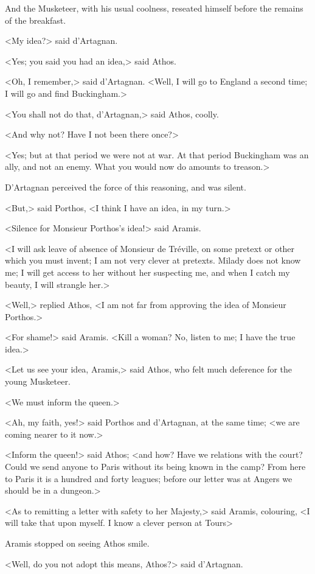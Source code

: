 And the Musketeer, with his usual coolness, reseated himself before the remains of the breakfast. 

<My idea?> said d'Artagnan. 

<Yes; you said you had an idea,> said Athos. 

<Oh, I remember,> said d'Artagnan. <Well, I will go to England a second time; I will go and find Buckingham.> 

<You shall not do that, d'Artagnan,> said Athos, coolly. 

<And why not? Have I not been there once?> 

<Yes; but at that period we were not at war. At that period Buckingham was an ally, and not an enemy. What you would now do amounts to treason.> 

D'Artagnan perceived the force of this reasoning, and was silent. 

<But,> said Porthos, <I think I have an idea, in my turn.> 

<Silence for Monsieur Porthos's idea!> said Aramis. 

<I will ask leave of absence of Monsieur de Tréville, on some pretext or other which you must invent; I am not very clever at pretexts. Milady does not know me; I will get access to her without her suspecting me, and when I catch my beauty, I will strangle her.> 

<Well,> replied Athos, <I am not far from approving the idea of Monsieur Porthos.> 

<For shame!> said Aramis. <Kill a woman? No, listen to me; I have the true idea.> 

<Let us see your idea, Aramis,> said Athos, who felt much deference for the young Musketeer. 

<We must inform the queen.> 

<Ah, my faith, yes!> said Porthos and d'Artagnan, at the same time; <we are coming nearer to it now.> 

<Inform the queen!> said Athos; <and how? Have we relations with the court? Could we send anyone to Paris without its being known in the camp? From here to Paris it is a hundred and forty leagues; before our letter was at Angers we should be in a dungeon.> 

<As to remitting a letter with safety to her Majesty,> said Aramis, colouring, <I will take that upon myself. I know a clever person at Tours\longdash> 

Aramis stopped on seeing Athos smile. 

<Well, do you not adopt this means, Athos?> said d'Artagnan. 

